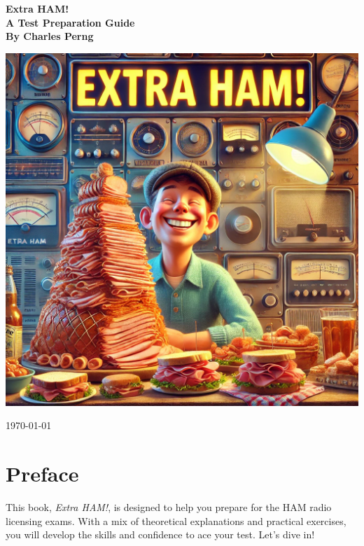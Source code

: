 \documentclass[12pt]{book}
\begin{document}
\begin{titlepage}
    \centering
    {\Huge\bfseries Extra HAM! \\
    \vspace{0.5cm}
    A Test Preparation Guide \\
    \vspace{1cm}
    \large By Charles Perng}
    
    \vspace{4cm}
    \includegraphics[width=\textwidth]{extra-ham.png} %
    
    \vfill
    {\large \today}
\end{titlepage}

\tableofcontents
\newpage

\chapter*{Preface}
This book, \textit{Extra HAM!}, is designed to help you prepare for the HAM radio licensing exams. With a mix of theoretical explanations and practical exercises, you will develop the skills and confidence to ace your test. Let’s dive in!

\newpage




\newpage

\appendix
\end{document}
